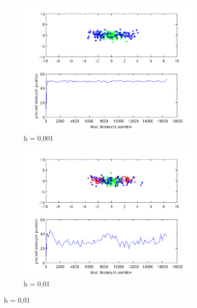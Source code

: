\documentclass[10pt,a4paper]{article}
\begin{document}
\begin{figure}[H]

   \begin{subfigure}[b]{0.5\textwidth}
    \includegraphics[width=\textwidth]{test2_h0_001.png}
    \caption{h = 0,001}
  \end{subfigure}
  \hfill
  \begin{subfigure}[b]{0.5\textwidth}
    \includegraphics[width=\textwidth]{test2_h0_01.png}
    \caption{h = 0,01}
  \end{subfigure}
  

\end{figure}
\end{document}
